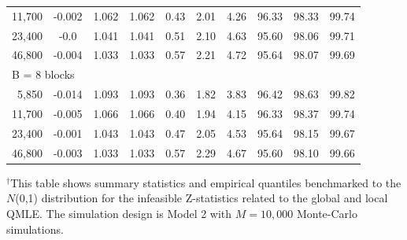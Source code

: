 \documentclass[11pt]{article}
\numberwithin{equation}{section}
\theoremstyle{plain}
\theoremstyle{remark}
\begin{document}
\begin{table}[]
\begin{tabular}{@{}rccccccccc@{}}
11,700 & -0.002&1.062&1.062&0.43&2.01&4.26&96.33&98.33&99.74\\
23,400 &  -0.0&1.041&1.041&0.51&2.10&4.63&95.60&98.06&99.71\\
46,800 &  -0.004&1.033&1.033&0.57&2.21&4.72&95.64&98.07&99.69\\
\multicolumn{10}{l}{B = 8 blocks} \\
5,850 & -0.014&1.093&1.093&0.36&1.82&3.83&96.42&98.63&99.82\\
11,700 & -0.005&1.066&1.066&0.40&1.94&4.15&96.33&98.37&99.74\\
23,400 & -0.001&1.043&1.043&0.47&2.05&4.53&95.64&98.15&99.67\\
46,800 &  -0.003&1.033&1.033&0.57&2.29&4.67&95.60&98.10&99.66\\
\bottomrule
\end{tabular}

\scriptsize $^\dag$This table shows summary statistics and empirical quantiles benchmarked to the $N$(0,1) distribution for the infeasible Z-statistics related to the global and local QMLE. The simulation design is Model 2 with $M = 10,000$ Monte-Carlo simulations. 
\end{table}
\end{document}

